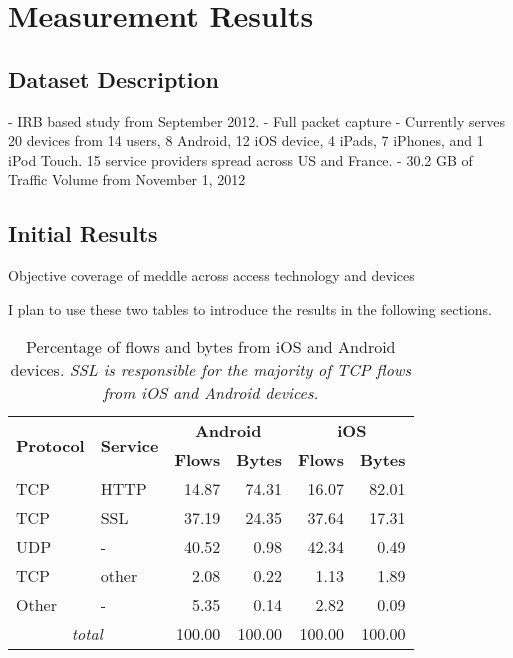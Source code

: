 \section{Measurement Results}
\label{sec:measurement-results}

\subsection{Dataset Description}
\label{sec:dataset-description}

- IRB based study from September 2012. 
- Full packet capture
- Currently serves 20 devices from 14 users, 8 Android, 12 iOS device,    
  4 iPads, 7 iPhones, and 1 iPod Touch.
  15 service providers spread across US and France.
- 30.2 GB of Traffic Volume from November 1, 2012

\subsection{Initial Results}
\label{sec:initial-results}

Objective  coverage of meddle across access technology and devices 

I plan to use these two tables to introduce the results in the
following sections.


\begin{table}
\begin{center}
\begin{tabular}{|l|l|r|r|r|r|}
\hline
\multirow{2}{*}{\bf Protocol} & \multirow{2}{*}{\bf Service} & \multicolumn{2}{|c|}{\bf Android} & \multicolumn{2}{|c|}{\bf iOS} \tabularnewline
\cline{3-6}
           &           &  \textbf{Flows}  &  \textbf{Bytes}  &  \textbf{Flows}  &  \textbf{Bytes}  \tabularnewline
\hline
 TCP       &  HTTP     &  14.87  &  74.31  &  16.07  &  82.01  \tabularnewline
\hline
TCP       &  SSL      &  37.19  &  24.35  &  37.64  &  17.31  \tabularnewline
\hline
 UDP       &  -        &  40.52  &   0.98  &  42.34  &   0.49  \tabularnewline
\hline
 TCP       &  other    &   2.08  &   0.22  &   1.13  &   1.89  \tabularnewline
\hline
 Other     &  -        &   5.35  &   0.14  &   2.82  &   0.09  \tabularnewline
\hline
\multicolumn{2}{|c|}{\emph{total}} & 100.00 & 100.00 & 100.00 & 100.00 \tabularnewline
\hline
\end{tabular}
\end{center}
\caption{Percentage of flows and bytes from iOS and Android devices.  \emph{SSL is responsible for the majority of
    TCP flows from iOS and Android devices.}} 
\label{tab:summaryIOSAndroidTraffic}
\end{table}

